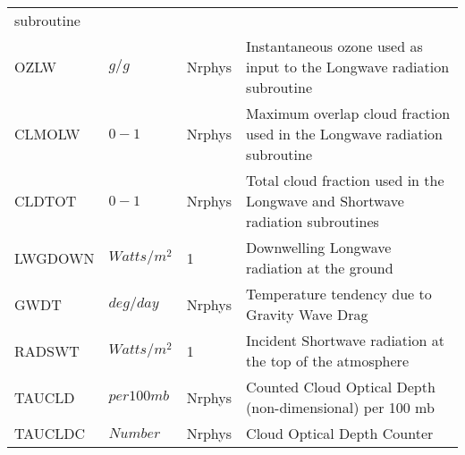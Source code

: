\begin{tabular}{llll}
\begin{minipage}[t]{3in}
{      subroutine} 
     \end{minipage}\\
 OZLW     &    $g/g$   &  Nrphys 
     &\begin{minipage}[t]{3in}
      {Instantaneous ozone used as input to the Longwave radiation
      subroutine} 
     \end{minipage}\\
 CLMOLW   &    $0-1$   &  Nrphys 
     &\begin{minipage}[t]{3in}
      {Maximum overlap cloud fraction used in the Longwave radiation
      subroutine} 
     \end{minipage}\\
 CLDTOT   &    $0-1$   &  Nrphys 
     &\begin{minipage}[t]{3in}
      {Total cloud fraction used in the Longwave and Shortwave radiation
      subroutines} 
     \end{minipage}\\
 LWGDOWN  &    $Watts/m^2$   &  1 
     &\begin{minipage}[t]{3in}
      {Downwelling Longwave radiation at the ground}
     \end{minipage}\\
 GWDT     &    $deg/day$ &  Nrphys
     &\begin{minipage}[t]{3in}
      {Temperature tendency due to Gravity Wave Drag}
     \end{minipage}\\
 RADSWT   &    $Watts/m^2$   &  1 
     &\begin{minipage}[t]{3in}
      {Incident Shortwave radiation at the top of the atmosphere}
     \end{minipage}\\
 TAUCLD   &    $per 100 mb$   &  Nrphys 
     &\begin{minipage}[t]{3in}
      {Counted Cloud Optical Depth (non-dimensional) per 100 mb}
     \end{minipage}\\
 TAUCLDC  &    $Number$   &  Nrphys 
     &\begin{minipage}[t]{3in}
      {Cloud Optical Depth Counter}
     \end{minipage}\\
\end{tabular}
\vfill

